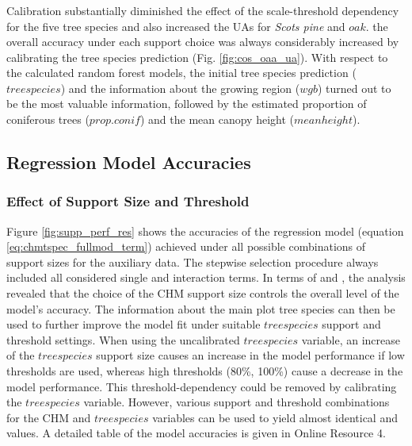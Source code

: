 \subsubsection*{}
Calibration substantially diminished the effect of the scale-threshold dependency for the five tree species and also increased the UAs for \textit{Scots pine} and $oak$.  the overall accuracy under each support choice was always considerably increased by calibrating the tree species prediction (Fig. \ref{fig:cos_oaa_ua}). With respect to the calculated random forest models, the initial tree species prediction ($treespecies$) and the information about the growing region ($wgb$) turned out to be the most valuable information, followed by the estimated proportion of coniferous trees ($prop.conif$) and the mean canopy height ($meanheight$).


\subsection{Regression Model Accuracies}
\label{sec:supp_chm_tspec_res}


\subsubsection*{Effect of Support Size and Threshold}

Figure \ref{fig:supp_perf_res} shows the accuracies of the regression model (equation \ref{eq:chmtspec_fullmod_term}) achieved under all possible combinations of support sizes for the auxiliary data. The stepwise selection procedure always included all considered single and interaction terms. In terms of \adjrsq{} and \rmsecv{}, the analysis revealed that the choice of the CHM support size controls the overall level of the model's accuracy. The information about the main plot tree species can then be used to further improve the model fit under suitable $treespecies$ support and threshold settings. When using the uncalibrated $treespecies$ variable, an increase of the $treespecies$ support size causes an increase in the model performance if low thresholds are used, whereas high thresholds (80\%, 100\%) cause a decrease in the model performance. This threshold-dependency could be removed by calibrating the $treespecies$ variable.  However, various support and threshold combinations for the CHM and $treespecies$ variables can be used to yield almost identical \rmsecv{} and \adjrsq{} values. A detailed table of the model accuracies is given in Online Resource 4.

